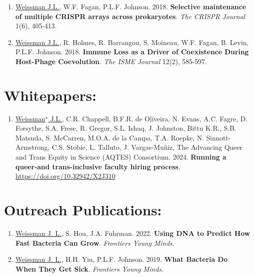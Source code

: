 \documentclass[]{res}
\begin{document}
\begin{resume}
\begin{enumerate}[leftmargin=*]
 \item \underline{Weissman J.L.}, W.F. Fagan, P.L.F. Johnson. 2018. {\bf Selective maintenance of multiple CRISPR arrays across prokaryotes}. \emph{The CRISPR Journal} 1(6), 405-413. %
 
\item \underline{Weissman J.L.}, R. Holmes, R. Barrangou, S. Moineau, W.F. Fagan, B. Levin, P.L.F. Johnson. 2018. {\bf Immune Loss as a Driver of Coexistence During Host-Phage Coevolution}. \emph{The ISME Journal} 12(2), 585-597. %

\end{enumerate} 

\section{Whitepapers:} \vspace{0mm}

 \begin{enumerate}[leftmargin=*]

\item \underline{Weissman$^\star$ J.L.}, C.R. Chappell, B.F.R. de Oliveira, N. Evans, A.C. Fagre, D. Forsythe, S.A. Frese, R. Gregor, S.L. Ishaq, J. Johnston, Bittu K.R., S.B. Matsuda, S. McCarren, M.O.A. de la Campa, T.A. Roepke, N. Sinnott-Armstrong, C.S. Stobie, L. Talluto, J. Vargas-Muñiz, The Advancing Queer and Trans Equity in Science (AQTES) Consortium. 2024. {\bf Running a queer-and trans-inclusive faculty hiring process}. \url{https://doi.org/10.32942/X2J310}

  \end{enumerate} 
 
\newpage
 
\section{Outreach Publications:} \vspace{0mm}

 \begin{enumerate}[leftmargin=*]

\item \underline{Weissman J. L.}, S. Hou, J.A. Fuhrman. 2022. {\bf Using DNA to Predict How Fast Bacteria Can Grow}. \emph{Frontiers Young Minds.}

\item \underline{Weissman J. L.}, H.H. Yiu, P.L.F. Johnson. 2019. {\bf What Bacteria Do When They Get Sick}. \emph{Frontiers Young Minds.}


\end{enumerate}
\end{resume}
\end{document}
